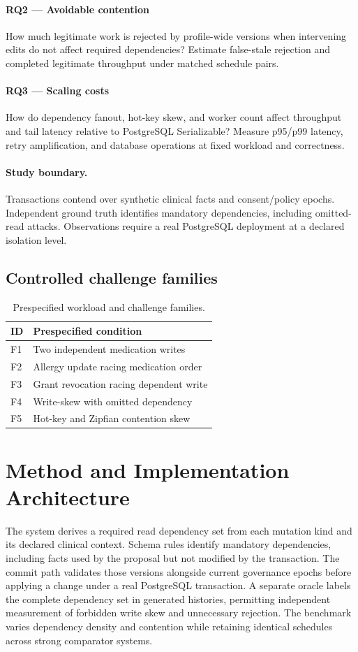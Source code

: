 \documentclass[11pt,a4paper]{article}
\begin{document}
\paragraph{RQ2 — Avoidable contention} How much legitimate work is rejected by profile-wide versions when intervening edits do not affect required dependencies? Estimate false-stale rejection and completed legitimate throughput under matched schedule pairs.

\paragraph{RQ3 — Scaling costs} How do dependency fanout, hot-key skew, and worker count affect throughput and tail latency relative to PostgreSQL Serializable? Measure p95/p99 latency, retry amplification, and database operations at fixed workload and correctness.

\paragraph{Study boundary.} Transactions contend over synthetic clinical facts and consent/policy epochs. Independent ground truth identifies mandatory dependencies, including omitted-read attacks. Observations require a real PostgreSQL deployment at a declared isolation level.

\subsection{Controlled challenge families}
\begin{table}[ht]
\centering\small
\caption{Prespecified workload and challenge families.}
\begin{tabularx}{\linewidth}{@{}lX@{}}\toprule
ID & Prespecified condition \\ \midrule
F1 & Two independent medication writes \\ 
F2 & Allergy update racing medication order \\ 
F3 & Grant revocation racing dependent write \\ 
F4 & Write-skew with omitted dependency \\ 
F5 & Hot-key and Zipfian contention skew \\ 
\bottomrule\end{tabularx}\end{table}

\section{Method and Implementation Architecture}
The system derives a required read dependency set from each mutation kind and its declared clinical context. Schema rules identify mandatory dependencies, including facts used by the proposal but not modified by the transaction. The commit path validates those versions alongside current governance epochs before applying a change under a real PostgreSQL transaction. A separate oracle labels the complete dependency set in generated histories, permitting independent measurement of forbidden write skew and unnecessary rejection. The benchmark varies dependency density and contention while retaining identical schedules across strong comparator systems.
\end{document}
